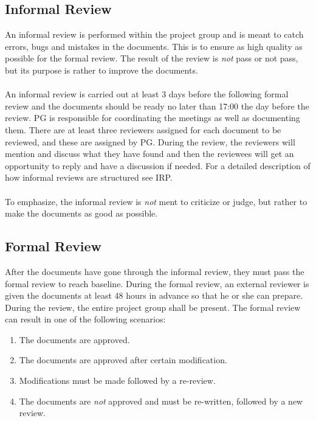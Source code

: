 \documentclass{article}
\begin{document}
    \subsection{Informal Review \label{informalreview}}
        An informal review is performed within the project group and is meant to catch
        errors, bugs and mistakes in the documents. This is to ensure as high quality
        as possible for the formal review. The result of the review is \emph{not} pass or
        not pass, but its purpose is rather to improve the documents.
        \\ \\
        An informal review is carried out at least 3 days before the following formal review and the documents
        should be ready no later than 17:00 the day before the review. PG is responsible
        for coordinating the meetings as well as documenting them.
        There are at least three reviewers assigned for each document to be reviewed, and these
        are assigned by PG. During the review, the reviewers will mention and discuss what they have
        found and then the reviewees will get an opportunity to reply and have a discussion
        if needed. For a detailed description of how informal reviews are structured see IRP.
        \\ \\
        To emphasize, the informal review is \emph{not} ment to criticize or judge, but rather
        to make the documents as good as possible. 
        
    
    \subsection{Formal Review \label{formalreview}}
        After the documents have gone through the informal review, they must pass the formal review
        to reach baseline. During the formal review, an external reviewer is
        given the documents at least 48 hours in advance so that he or she can prepare.
        During the review, the entire project group shall be present.
        The formal review can result in one of the following scenarios:
        \begin{enumerate}
            \item The documents are approved.
            \item The documents are approved after certain modification.
            \item Modifications must be made followed by a re-review.
            \item The documents are \emph{not} approved and must be re-written,
                    followed by a new review.
        \end{enumerate}
    
\end{document}
